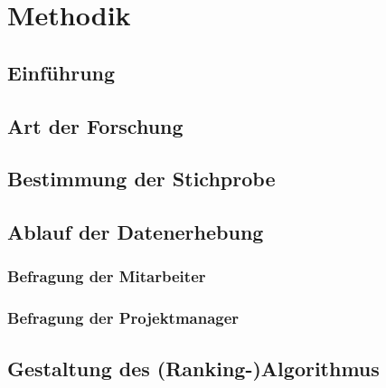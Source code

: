 
\chapter{Methodik}
\label{ch:methodik}

\section{Einführung}

\section{Art der Forschung}

\section{Bestimmung der Stichprobe}

\section{Ablauf der Datenerhebung}

\subsection{Befragung der Mitarbeiter}

\subsection{Befragung der Projektmanager}

\section{Gestaltung des (Ranking-)Algorithmus}


